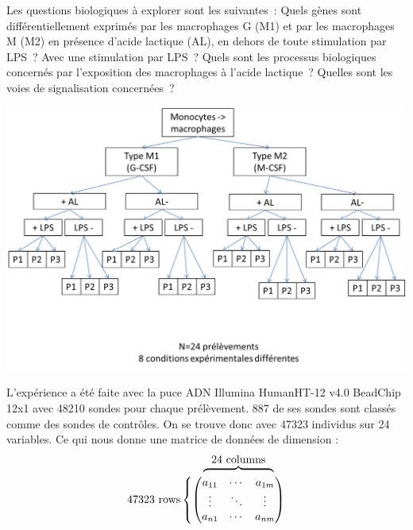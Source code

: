 \documentclass[a4paper,10pt]{article}
\begin{document}
Les questions biologiques à explorer sont les suivantes : Quels gènes sont différentiellement exprimés par les macrophages  G (M1) et par les macrophages M (M2) en présence d’acide lactique (AL), en dehors de toute stimulation par LPS ? Avec une stimulation par LPS ? Quels sont les processus biologiques concernés par l’exposition des macrophages à l’acide lactique ? Quelles sont les voies de signalisation concernées ?
\begin{center}
 \includegraphics[scale=0.5]{./image/plan.png}
\end{center}
L’expérience a été faite avec la puce ADN  Illumina HumanHT-12 v4.0 BeadChip 12x1 avec 48210 sondes pour chaque prélèvement.
887 de ses sondes sont classés comme des sondes de contrôles.
On se trouve donc avec 47323 individus sur 24 variables. 
Ce qui nous donne une matrice de données de dimension :
\def\tmp{
  \begin{pmatrix}
  a_{11} & \cdots & a_{1m} \\

   \vdots & \ddots &\vdots \\

   a_{n1} & \cdots & a_{nm} 
 \end{pmatrix}
}
\[
\stackMath\def\stackalignment{r}
  \stackon
    {\mathrm{47323~rows}\left\{\tmp\right.}
    {\overbrace{\phantom{\smash{\tmp\mkern -36mu}}}^{\mathrm{\textstyle 24~columns}}\mkern 20mu}
\]
\end{document}
